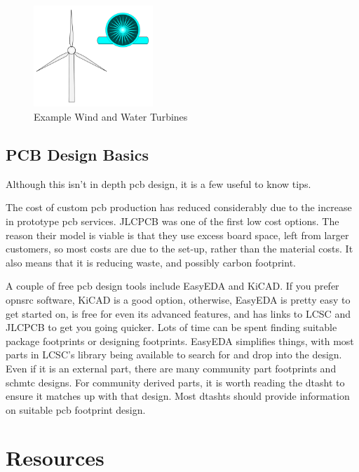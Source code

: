 \documentclass[a4paper,11pt]{report}
\begin{document}
\begin{figure}[H]
\centering
\includegraphics[width=0.4\textwidth]{turbines}
\caption{Example Wind and Water Turbines}
\end{figure}

\vspace*{1\baselineskip}

\subsection{PCB Design Basics}

Although this isn't in depth \gls{pcb} design, it is a few useful to know tips.

The cost of custom \gls{pcb} production has reduced considerably due to the increase in prototype \gls{pcb} services. JLCPCB was one of the first low cost options. The reason their model is viable is that they use excess board space, left from larger customers, so most costs are due to the set-up, rather than the material costs. It also means that it is reducing waste, and possibly carbon footprint.

A couple of free \gls{pcb} design tools include EasyEDA and KiCAD. If you prefer \gls{opnsrc} software, KiCAD is a good option, otherwise, EasyEDA is pretty easy to get started on, is free for even its advanced features, and has links to LCSC and JLCPCB to get you going quicker. Lots of time can be spent finding suitable package footprints or designing footprints. EasyEDA simplifies things, with most parts in LCSC's library being available to search for and drop into the design. Even if it is an external part, there are many community part footprints and \gls{schmtc} designs. For community derived parts, it is worth reading the \gls{dtasht} to ensure it matches up with that design. Most \gls{dtasht}s should provide information on suitable \gls{pcb} footprint design.

\pagebreak

\section{Resources}
\end{document}
